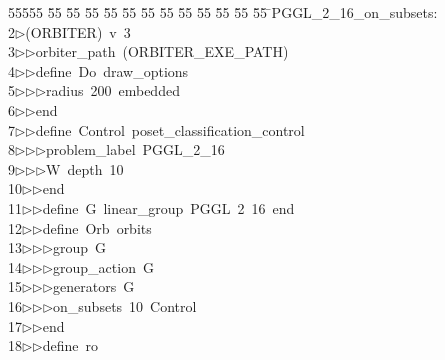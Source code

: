 %
%
\begin{tabbing}
55555 \= 55 \= 55 \= 55 \= 55 \= 55 \= 55 \= 55 \= 55 \= 55 \= 55 \= 55 \= 55 \= \>PGGL\_2\_16\_on\_subsets:\\[0pt]
2\>$\triangleright$\>(ORBITER)\ v\ 3\ \\[0pt]
3\>$\triangleright$\>$\triangleright$\>orbiter\_path\ (ORBITER\_EXE\_PATH)\ \\[0pt]
4\>$\triangleright$\>$\triangleright$\>define\ Do\ draw\_options\ \\[0pt]
5\>$\triangleright$\>$\triangleright$\>$\triangleright$\>radius\ 200\ embedded\ \\[0pt]
6\>$\triangleright$\>$\triangleright$\>end\ \\[0pt]
7\>$\triangleright$\>$\triangleright$\>define\ Control\ poset\_classification\_control\ \\[0pt]
8\>$\triangleright$\>$\triangleright$\>$\triangleright$\>problem\_label\ PGGL\_2\_16\ \\[0pt]
9\>$\triangleright$\>$\triangleright$\>$\triangleright$\>W\ depth\ 10\ \\[0pt]
10\>$\triangleright$\>$\triangleright$\>end\ \\[0pt]
11\>$\triangleright$\>$\triangleright$\>define\ G\ linear\_group\ PGGL\ 2\ 16\ end\ \\[0pt]
12\>$\triangleright$\>$\triangleright$\>define\ Orb\ orbits\ \\[0pt]
13\>$\triangleright$\>$\triangleright$\>$\triangleright$\>group\ G\ \\[0pt]
14\>$\triangleright$\>$\triangleright$\>$\triangleright$\>group\_action\ G\ \\[0pt]
15\>$\triangleright$\>$\triangleright$\>$\triangleright$\>generators\ G\ \\[0pt]
16\>$\triangleright$\>$\triangleright$\>$\triangleright$\>on\_subsets\ 10\ Control\ \\[0pt]
17\>$\triangleright$\>$\triangleright$\>end\ \\[0pt]
18\>$\triangleright$\>$\triangleright$\>define\ ro\ \\[0pt]

\end{tabbing}
